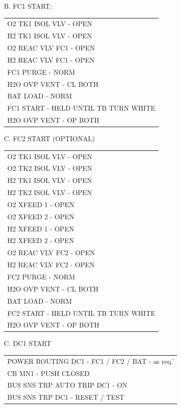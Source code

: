 \documentclass[Orbiter User Manual.tex]{subfiles}
\begin{document}
B. FC1 START:
	\begin{longtable}{ p{\textwidth} }
	O2 TK1 ISOL VLV - OPEN\\
	H2 TK1 ISOL VLV - OPEN\\
	O2 REAC VLV FC1 - OPEN\\
	H2 REAC VLV FC1 - OPEN\\
	FC1 PURGE - NORM\\
	H2O OVP VENT - CL BOTH\\
	BAT LOAD - NORM\\
	FC1 START - HELD UNTIL TB TURN WHITE\\
	H2O OVP VENT - OP BOTH
	\end{longtable}

C. FC2 START (OPTIONAL)
	\begin{longtable}{ p{\textwidth} }
	O2 TK1 ISOL VLV - OPEN\\
	O2 TK2 ISOL VLV - OPEN\\
	H2 TK1 ISOL VLV - OPEN\\
	H2 TK2 ISOL VLV - OPEN\\
	O2 XFEED 1 - OPEN\\
	O2 XFEED 2 - OPEN\\
	H2 XFEED 1 - OPEN\\
	H2 XFEED 2 - OPEN\\
	O2 REAC VLV FC2 - OPEN\\
	H2 REAC VLV FC2 - OPEN\\
	FC2 PURGE - NORM\\
	H2O OVP VENT - CL BOTH\\
	BAT LOAD - NORM\\
	FC2 START - HELD UNTIL TB TURN WHITE\\
	H2O OVP VENT - OP BOTH
	\end{longtable}

C. DC1 START
	\begin{longtable}{ p{\textwidth} }
	POWER ROUTING DC1 - FC1 / FC2 / BAT - as req.'\\
	CB MN1 - PUSH CLOSED\\
	BUS SNS TRP AUTO TRIP DC1 - ON\\
	BUS SNS TRP DC1 - RESET / TEST
	\end{longtable}
\end{document}

